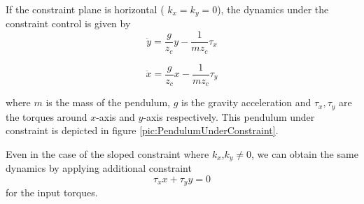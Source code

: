 If the constraint plane is horizontal ( $k_x = k_y = 0$),
the dynamics under the constraint control is given by
\begin{equation}
\ddot{y} = \frac{g}{z_c} y - \frac{1}{m z_c} \tau_x 
\label{eq:DynConstraintLawY}
\end{equation}

\begin{equation}
\ddot{x} = \frac{g}{z_c} x - \frac{1}{m z_c} \tau_y 
\label{eq:DynConstraintLawX}
\end{equation}

where $m$ is the mass of the pendulum, $g$ is the gravity acceleration
and $\tau_x, \tau_y$ are the torques around $x$-axis and $y$-axis
respectively. This pendulum under constraint is depicted in figure \ref{pic:PendulumUnderConstraint}.
\par
Even in the case of the sloped constraint where $k_x$,$k_y \neq 0 $, 
we can obtain the same dynamics by applying additional constraint
\begin{equation}
\tau_x x + \tau_y y  = 0
\label{eq:ConstraintTorque}
\end{equation}
for the input torques.

